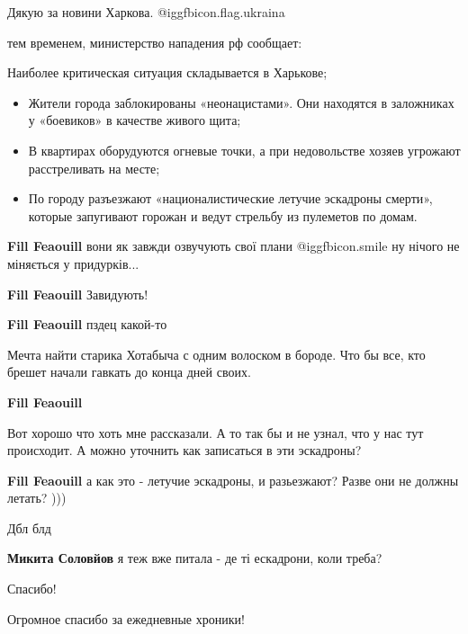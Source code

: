 \begin{itemize}
Дякую за новини Харкова. @igg{fbicon.flag.ukraina}


тем временем, министерство нападения рф сообщает:

Наиболее критическая ситуация складывается в Харькове;

\begin{itemize} %
\item Жители города заблокированы «неонацистами». Они находятся в заложниках у
				«боевиков» в качестве живого щита;

\item В квартирах оборудуются огневые точки, а при недовольстве хозяев угрожают
				расстреливать на месте;

\item По городу разъезжают «националистические летучие эскадроны смерти», которые
запугивают горожан и ведут стрельбу из пулеметов по домам.

\end{itemize} %

\begin{itemize} %
\textbf{Fill Feaouill} вони як завжди озвучують свої плани  @igg{fbicon.smile}  ну нічого не міняється у придурків...

\textbf{Fill Feaouill} Завидують!

\textbf{Fill Feaouill} пздец какой-то


Мечта найти старика Хотабыча с одним волоском в бороде. Что бы все, кто брешет
начали гавкать до конца дней своих.

\textbf{Fill Feaouill} 

Вот хорошо что хоть мне рассказали. А то так бы и не узнал, что у нас тут
происходит. А можно уточнить как записаться в эти эскадроны?

\textbf{Fill Feaouill} а как это - летучие эскадроны, и разьезжают? Разве они не должны летать? )))

Дбл блд

\textbf{Микита Соловйов} я теж вже питала - де ті ескадрони, коли треба?
\end{itemize} %

Спасибо!

Огромное спасибо за ежедневные хроники!


\end{itemize}
